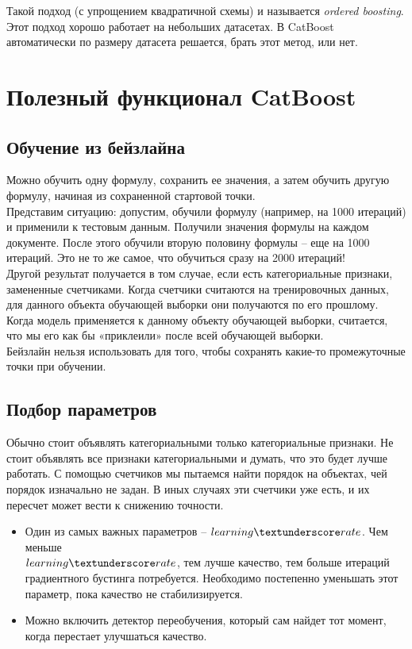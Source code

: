 \documentclass[a4paper,12pt]{article}
\begin{document}
Такой подход (с упрощением квадратичной схемы) и называется \textit{ordered boosting}. Этот подход хорошо работает на небольших датасетах. В CatBoost автоматически по размеру датасета решается, брать этот метод, или нет. 

\section{Полезный функционал CatBoost}
\subsection{Обучение из бейзлайна}
Можно обучить одну формулу, сохранить ее значения, а затем обучить другую формулу, начиная из сохраненной стартовой точки. \\

Представим ситуацию: допустим, обучили формулу (например, на 1000 итераций) и применили к тестовым данным. Получили значения формулы на каждом документе. После этого обучили вторую половину формулы – еще на 1000 итераций. Это не то же самое, что обучиться сразу на 2000 итераций! \\

Другой результат получается в том случае, если есть категориальные признаки, замененные счетчиками. Когда счетчики считаются на тренировочных данных, для данного объекта обучающей выборки они получаются по его прошлому. Когда модель применяется к данному объекту обучающей выборки, считается, что мы его как бы «приклеили» после всей обучающей выборки. \\

Бейзлайн нельзя использовать для того, чтобы сохранять какие-то промежуточные точки при обучении.

\subsection{Подбор параметров}
Обычно стоит объявлять категориальными только категориальные признаки. Не стоит объявлять все признаки категориальными и думать, что это будет лучше работать. С помощью счетчиков мы пытаемся найти порядок на объектах, чей порядок изначально не задан. В иных случаях эти счетчики уже есть, и их пересчет может вести к снижению точности. 

\begin{itemize}[noitemsep]
\item Один из самых важных параметров – $learning\textunderscore rate$. Чем меньше \\ $learning \textunderscore rate$, тем лучше качество, тем больше итераций градиентного бустинга потребуется. Необходимо постепенно уменьшать этот параметр, пока качество не стабилизируется. 
\item Можно включить детектор переобучения, который сам найдет тот момент, когда перестает улучшаться качество. 
\end{itemize}
\end{document}
